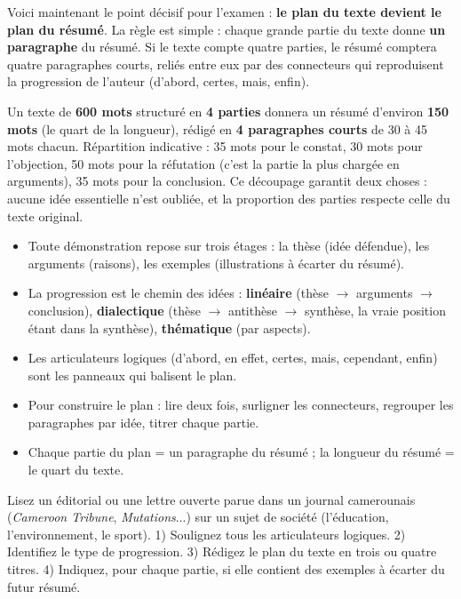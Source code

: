 \documentclass[11pt]{article}
\newcommand{\cle}[1]{{\popxbold\color{popdark}#1}}
\newcounter{popsec}
\newcounter{popsub}
\newcommand{\courssub}[1]{%
  \stepcounter{popsub}%
  \par\vspace{9pt}\noindent{\popxbold\fontsize{11.5}{13}\selectfont\color{popink}{\color{poporange}\thepopsec.\thepopsub}\hspace{6pt}#1}\par\nopagebreak\vspace{4pt}
}
\begin{document}
\courssub{Du plan du texte au plan du résumé}

Voici maintenant le point décisif pour l'examen : \textbf{le plan du texte devient le plan du résumé}. La règle est simple : chaque grande partie du texte donne \textbf{un paragraphe} du résumé. Si le texte compte quatre parties, le résumé comptera quatre paragraphes courts, reliés entre eux par des connecteurs qui reproduisent la progression de l'auteur (d'abord, certes, mais, enfin).

\begin{exemplebox}
Un texte de \textbf{600 mots} structuré en \textbf{4 parties} donnera un résumé d'environ \textbf{150 mots} (le quart de la longueur), rédigé en \textbf{4 paragraphes courts} de 30 à 45 mots chacun. Répartition indicative : 35 mots pour le constat, 30 mots pour l'objection, 50 mots pour la réfutation (c'est la partie la plus chargée en arguments), 35 mots pour la conclusion. Ce découpage garantit deux choses : aucune idée essentielle n'est oubliée, et la proportion des parties respecte celle du texte original.
\end{exemplebox}

\begin{aretenir}
\begin{itemize}
\item Toute démonstration repose sur trois étages : la \cle{thèse} (idée défendue), les \cle{arguments} (raisons), les \cle{exemples} (illustrations à écarter du résumé).
\item La \cle{progression} est le chemin des idées : \textbf{linéaire} (thèse $\rightarrow$ arguments $\rightarrow$ conclusion), \textbf{dialectique} (thèse $\rightarrow$ antithèse $\rightarrow$ synthèse, la vraie position étant dans la synthèse), \textbf{thématique} (par aspects).
\item Les \cle{articulateurs logiques} (d'abord, en effet, certes, mais, cependant, enfin) sont les panneaux qui balisent le plan.
\item Pour construire le plan : lire deux fois, surligner les connecteurs, regrouper les paragraphes par idée, titrer chaque partie.
\item Chaque partie du plan = un paragraphe du résumé ; la longueur du résumé = le quart du texte.
\end{itemize}
\end{aretenir}

\begin{exercice}
Lisez un éditorial ou une lettre ouverte parue dans un journal camerounais (\emph{Cameroon Tribune}, \emph{Mutations}...) sur un sujet de société (l'éducation, l'environnement, le sport). 1) Soulignez tous les articulateurs logiques. 2) Identifiez le type de progression. 3) Rédigez le plan du texte en trois ou quatre titres. 4) Indiquez, pour chaque partie, si elle contient des exemples à écarter du futur résumé.
\end{exercice}
\end{document}
